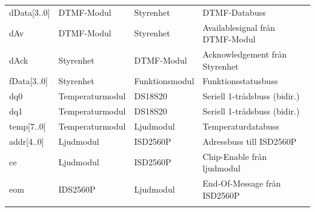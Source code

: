 \documentclass[a4paper,11pt]{article}
\begin{document}
\begin{table} [H]
\begin{tabular}{l l l l}
		dData[3..0] & DTMF-Modul & Styrenhet & DTMF-Databuss\\
		dAv & DTMF-Modul & Styrenhet & Availablesignal från DTMF-Modul\\
		dAck & Styrenhet & DTMF-Modul & Acknowledgement från Styrenhet\\

		fData[3..0] & Styrenhet & Funktionsmodul & Funktionsstatusbuss\\

		dq0 & Temperaturmodul & DS18S20 & Seriell 1-trådsbuss (bidir.)\\
		dq1 & Temperaturmodul & DS18S20 & Seriell 1-trådsbuss (bidir.)\\

		temp[7..0] & Temperaturmodul & Ljudmodul & Temperaturdatabuss\\

		addr[4..0] & Ljudmodul & ISD2560P & Adressbuss till ISD2560P\\
		ce & Ljudmodul & ISD2560P & Chip-Enable från ljudmodul\\
		eom & IDS2560P & Ljudmodul & End-Of-Message från ISD2560P\\\\
	\end{tabular}
	\end{table}
\end{document}
